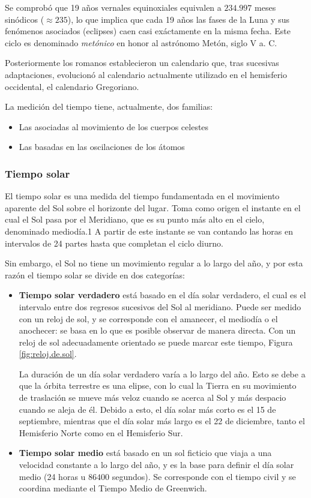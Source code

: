  Se comprob\'o que  19 a\~nos vernales equinoxiales equivalen a $234.997$ meses sin\'odicos ($\approx 235$), lo que implica que cada 19 a\~nos las fases de la Luna y sus fen\'omenos asociados (eclipses) caen casi ex\'actamente en la misma fecha. Este ciclo es denominado \emph{met\'onico} en honor al astr\'onomo Met\'on, siglo V a. C.

 Posteriormente los romanos establecieron un calendario que, tras sucesivas adaptaciones, evolucion\'o al calendario actualmente utilizado en el hemisferio occidental, el calendario Gregoriano.

 La medici\'on del tiempo tiene, actualmente, dos familias:
 \begin{itemize}
       \item Las asociadas al movimiento de los cuerpos celestes
       \item Las basadas en las oscilaciones de los \'atomos
 \end{itemize}

\subsubsection{Tiempo solar}
\label{sec:tiempo.solar}

El tiempo solar es una medida del tiempo fundamentada en el movimiento aparente del Sol sobre el horizonte del lugar. Toma como origen el instante en el cual el Sol pasa por el Meridiano, que es su punto más alto en el cielo, denominado mediodía.1 A partir de este instante se van contando las horas en intervalos de 24 partes hasta que completan el ciclo diurno.

Sin embargo, el Sol no tiene un movimiento regular a lo largo del año, y por esta razón el tiempo solar se divide en dos categorías:

\begin{itemize}
\item {\bf Tiempo solar verdadero} está basado en el día solar verdadero,
  el cual es el intervalo entre dos regresos sucesivos del Sol al
  meridiano. Puede ser medido con un reloj de sol, y se corresponde
  con el amanecer, el mediodía o el anochecer: se basa en lo que es
  posible observar de manera directa. Con un reloj de sol adecuadamente orientado se puede marcar este tiempo, Figura \ref{fig:reloj.de.sol}.

La duración de un día solar verdadero varía a lo largo del año. Esto se debe a que la órbita terrestre es una elipse, con lo cual la Tierra en su movimiento de traslación se mueve más veloz cuando se acerca al Sol y más despacio cuando se aleja de él. Debido a esto, el día solar más corto es el 15 de septiembre, mientras que el día solar más largo es el 22 de diciembre, tanto el Hemisferio Norte como en el Hemisferio Sur.


\item \textbf{ Tiempo solar medio} está basado en un sol ficticio que viaja a una   velocidad constante a lo largo del año, y es la base para definir el
  día solar medio (24 horas u $86400$ segundos). Se corresponde con el
  tiempo civil y se coordina mediante el Tiempo Medio de Greenwich.
\end{itemize}


